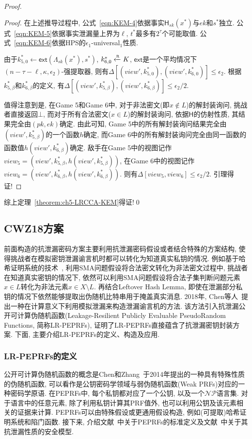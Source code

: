 \begin{proof}
\begin{proof}
在上述推导过程中, 公式~\eqref{eqn:KEM-4}依据事实$\mathsf{H}_{sk}(x^*)$与$ek$和$s^*$独立. 公式~\eqref{eqn:KEM-5}依据事实泄漏量上界为$\ell$, $t^*$最多有$2^{\tau}$个可能取值. 
公式~\eqref{eqn:KEM-6}依据HPS的$\epsilon_1$-universal$_1$性质. 

由于$k_{5,0}^* \leftarrow \mathsf{ext}(\Lambda_{sk}(x^*), s^*)$, $k_{6,0}^* \xleftarrow{\textup{\tiny R}} K$, 
$\mathsf{ext}$是一个平均情况下$(n - \tau - \ell, \kappa, \epsilon_2)$-强提取器, 
则有$\Delta[(view', k_{5,0}^*), (view', k_{6,0}^*)] \leq \epsilon_2$. 
根据$k_{5,\beta}^*$和$k_{6,\beta}^*$的定义, 有$\Delta[(view', k_{5,\beta}^*), (view', k_{6,\beta}^*)] \leq \epsilon_2/2$. 

值得注意到是, 在Game 5和Game 6中, 对于非法密文(即$x \notin L$)的解封装询问, 挑战者直接返回$\bot$, 而对于所有合法密文($x \in L$)的解封装询问, 依据$\mathsf{H}$的仿射性质, 其结果完全由$(pk, ek)$确定. 由此可知, Game 5中的所有解封装询问结果完全由$(view', k_{5, \beta}^*)$的一个函数$h$确定, 而Game 6中的所有解封装询问完全由同一函数的函数值$h(view', k_{6, \beta}^*)$确定. 敌手在Game 5中的视图记作$view_5 = (view', k_{5,\beta}^*,h(view',k_{5, \beta}^*))$, 在Game 6中的视图记作$view_6 = (view', k_{6,\beta}^*,h(view',k_{6, \beta}^*))$. 则有$\Delta[view_5, view_6] \leq \epsilon_2/2$. 引理得证!
\end{proof}
综上定理~\ref{theorem:ch5-LRCCA-KEM}得证!\qed 
\end{proof} 


\subsection{CWZ18方案}
前面构造的抗泄漏密码方案主要利用抗泄漏密码假设或者结合特殊的方案结构, 使得挑战者在模拟密钥泄漏谕言机时都可以转化为知道真实私钥的情况. 例如基于哈希证明系统的技术~\cite{NS-CRYPTO-2009}, 利用SMA问题假设将合法密文转化为非法密文过程中, 挑战者在知道真实密钥的情况下, 依然可以利用SMA问题假设将合法子集判断问题元素$x \in L$转化为非法元素$x \in X \setminus L$. 再结合Leftover Hash Lemma, 即使在泄漏部分私钥的情况下依然能够提取出伪随机比特串用于掩盖真实消息. 2018年, Chen等人~\cite{Chen-ASIACRYPT-2018}提出一种在计算意义下利用模拟泄漏来构造泄漏谕言机的方法. 该方法引入抗泄漏公开可计算伪随机函数(Leakage-Resilient Publicly Evaluable PseudoRandom Functions, 简称LR-PEPRFs), 证明了LR-PEPRFs直接蕴含了抗泄漏密钥封装方案. 下面, 主要介绍LR-PEPRFs的定义、构造及应用.   

\subsubsection{LR-PEPRFs的定义}
公开可计算伪随机函数的概念是Chen和Zhang~\cite{Chen-SCN-2014}于2014年提出的一种具有特殊性质的伪随机函数, 可以看作是公钥密码学领域与弱伪随机函数(Weak PRFs)对应的一种密码学原语. 在PEPRFs中, 每个私钥都对应了一个公钥, 以及一个$\mathcal{NP}$语言集. 对于语言中的任意元素, 除了利用私钥计算其PRF值外, 也可以利用公钥及该元素相关的证据来计算. PEPRFs可以由特殊假设或更通用假设构造, 例如(可提取)哈希证明系统和陷门函数. 接下来, 介绍文献~\cite{Chen-SCN-2014}中关于PEPRFs的标准定义及文献~\cite{Chen-ASIACRYPT-2018}中关于其抗泄漏性质的安全模型.

